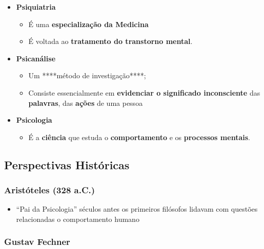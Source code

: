 \documentclass[
]{book}
\providecommand{\tightlist}{%
  \setlength{\itemsep}{0pt}\setlength{\parskip}{0pt}}
\begin{document}
\begin{itemize}
\tightlist
\item
  \textbf{Psiquiatria}

  \begin{itemize}
  \tightlist
  \item
    É uma \textbf{especialização da Medicina}
  \item
    É voltada ao \textbf{tratamento do transtorno mental}.
  \end{itemize}
\item
  \textbf{Psicanálise}

  \begin{itemize}
  \tightlist
  \item
    Um ****método de investigação****;
  \item
    Consiste essencialmente em \textbf{evidenciar o significado inconsciente} das \textbf{palavras}, das \textbf{ações} de uma pessoa
  \end{itemize}
\item
  \textbf{Psicologia}

  \begin{itemize}
  \tightlist
  \item
    É a \textbf{ciência} que estuda o \textbf{comportamento} e os \textbf{processos mentais}.
  \end{itemize}
\end{itemize}

\hypertarget{perspectivas-histuxf3ricas}{%
\subsection{Perspectivas Históricas}\label{perspectivas-histuxf3ricas}}

\hypertarget{aristuxf3teles-328-a.c.}{%
\subsubsection{Aristóteles (328 a.C.)}\label{aristuxf3teles-328-a.c.}}

\begin{itemize}
\tightlist
\item
  ``Pai da Psicologia'' séculos antes os primeiros filósofos lidavam com questões relacionadas o comportamento humano
\end{itemize}

\hypertarget{gustav-fechner}{%
\subsubsection{Gustav Fechner}\label{gustav-fechner}}
\end{document}
